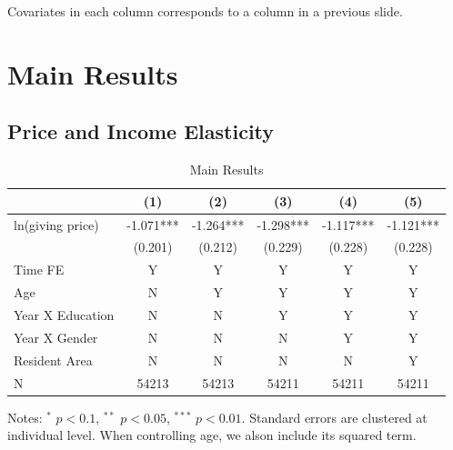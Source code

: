 \documentclass[ review  , 3p ]{elsarticle}
\begin{document}
  Covariates in each column corresponds to a column in a previous slide.

  \hypertarget{main-results}{%
  \section{Main Results}\label{main-results}}

  \hypertarget{price-and-income-elasticity}{%
  \subsection{Price and Income Elasticity}\label{price-and-income-elasticity}}

  \begin{table}

  \caption{\label{tab:kableEstimateElasticityPart1}Main Results}
  \centering
  \begin{threeparttable}
  \begin{tabular}[t]{lccccc}
  \toprule
   & (1) & (2) & (3) & (4) & (5)\\
  \midrule
  ln(giving price) & -1.071*** & -1.264*** & -1.298*** & -1.117*** & -1.121***\\
   & (0.201) & (0.212) & (0.229) & (0.228) & (0.228)\\
  Time FE & Y & Y & Y & Y & Y\\
  Age & N & Y & Y & Y & Y\\
  Year X Education & N & N & Y & Y & Y\\
  Year X Gender & N & N & N & Y & Y\\
  Resident Area & N & N & N & N & Y\\
  N & 54213 & 54213 & 54211 & 54211 & 54211\\
  \bottomrule
  \end{tabular}
  \begin{tablenotes}
  \item Notes: $^{*}$ $p < 0.1$, $^{**}$ $p < 0.05$, $^{***}$ $p < 0.01$. Standard errors are clustered at individual level. When controlling age, we alson include its squared term.
  \end{tablenotes}
  \end{threeparttable}
  \end{table}
\end{document}
